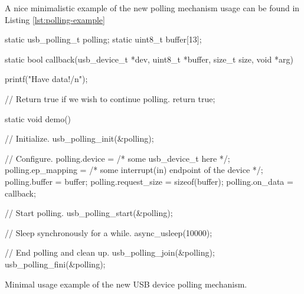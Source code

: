 A nice minimalistic example of the new polling mechanism usage can be found in
Listing \ref{lst:polling-example}

\begin{listing}
	\begin{code}
		static usb_polling_t polling;
		static uint8_t buffer[13];

		static bool callback(usb_device_t *dev, uint8_t *buffer, size_t size, void *arg)
		{
			printf("Have data!/n");

			// Return true if we wish to continue polling.
			return true;
		}

		static void demo()
		{
			// Initialize.
			usb_polling_init(&polling);

			// Configure.
			polling.device = /* some usb_device_t here */;
			polling.ep_mapping = /* some interrupt(in) endpoint of the device */;
			polling.buffer = buffer;
			polling.request_size = sizeof(buffer);
			polling.on_data = callback;

			// Start polling.
			usb_polling_start(&polling);

			// Sleep synchronously for a while.
			async_usleep(10000);

			// End polling and clean up.
			usb_polling_join(&polling);
			usb_polling_fini(&polling);
		}
	\end{code}
	\caption{Minimal usage example of the new USB device polling mechanism.}
	\label{lst:polling-example}
\end{listing}

